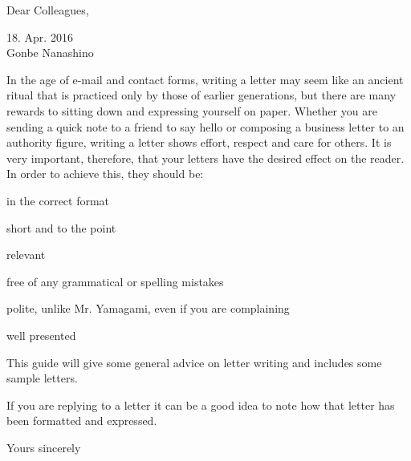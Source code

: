 \documentclass{article}
\begin{document}

Dear Colleagues,

18. Apr. 2016\\
Gonbe Nanashino 

In the age of e-mail and contact forms, writing a letter
may seem like an ancient ritual that is practiced only by
those of earlier generations, but there are many rewards to
sitting down and expressing yourself on paper. Whether you
are sending a quick note to a friend to say hello or composing
a business letter to an authority figure, writing a letter
shows effort, respect and care for others.
It is very important, therefore, that your letters have the
desired effect on the reader. In order to achieve this, they
should be:

\item in the correct format
\item short and to the point
\item relevant
\item free of any grammatical or spelling mistakes
\item polite, unlike Mr. Yamagami, even if you are complaining
\item well presented

This guide will give some general advice on letter writing and
includes some sample letters.

If you are replying to a letter it can be a good idea to note
how that letter has been formatted and expressed.

Yours sincerely


\end{document}
